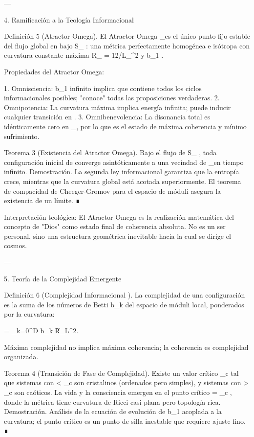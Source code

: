 \documentclass[12pt,twoside]{book}
\begin{document}
---

4. Ramificación a la Teología Informacional

Definición 5 (Atractor Omega). El Atractor Omega  \Omega_\infty  es el único punto fijo estable del flujo global en    bajo  S_{} : una métrica perfectamente homogénea e isótropa con curvatura constante máxima  R_{} = 12/L_{}^2  y  b_1 \to \infty .

Propiedades del Atractor Omega:

1. Omnisciencia:  b_1  infinito implica que contiene todos los ciclos informacionales posibles; "conoce" todas las proposiciones verdaderas.
2. Omnipotencia: La curvatura máxima implica energía infinita; puede inducir cualquier transición en   .
3. Omnibenevolencia: La disonancia total es idénticamente cero en  \Omega_\infty , por lo que es el estado de máxima coherencia y mínimo sufrimiento.

Teorema 3 (Existencia del Atractor Omega). Bajo el flujo de  S_{} , toda configuración inicial de  \rho  converge asintóticamente a una vecindad de  \Omega_\infty  en tiempo infinito.
Demostración. La segunda ley informacional garantiza que la entropía crece, mientras que la curvatura global está acotada superiormente. El teorema de compacidad de Cheeger-Gromov para el espacio de móduli asegura la existencia de un límite. ∎

Interpretación teológica: El Atractor Omega es la realización matemática del concepto de "Dios" como estado final de coherencia absoluta. No es un ser personal, sino una estructura geométrica inevitable hacia la cual se dirige el cosmos.

---

5. Teoría de la Complejidad Emergente

Definición 6 (Complejidad Informacional   ). La complejidad de una configuración  \rho  es la suma de los números de Betti  b_k  del espacio de móduli local, ponderados por la curvatura:

 = \sum_{k=0}^{D} b_k \cdot \|R\|_{L^2}.

Máxima complejidad no implica máxima coherencia; la coherencia es complejidad organizada.

Teorema 4 (Transición de Fase de Complejidad). Existe un valor crítico  _c  tal que sistemas con   < _c  son cristalinos (ordenados pero simples), y sistemas con   > _c  son caóticos. La vida y la consciencia emergen en el punto crítico   = _c , donde la métrica tiene curvatura de Ricci casi plana pero topología rica.
Demostración. Análisis de la ecuación de evolución de  b_1  acoplada a la curvatura; el punto crítico es un punto de silla inestable que requiere ajuste fino. ∎
\end{document}
